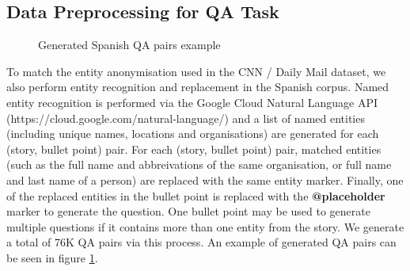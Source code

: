\documentclass[]{article}
\begin{document}
\subsection{Data Preprocessing for QA Task}

\begin{center}
\begin{figure}
\caption{Generated Spanish QA pairs example}
\label{fig:esqa}
\end{figure}
\end{center}

To match the entity anonymisation used in the CNN / Daily Mail dataset, we also perform entity recognition and replacement in the Spanish corpus. Named entity recognition is performed via the Google Cloud Natural Language API (https://cloud.google.com/natural-language/) and a list of named entities (including unique names, locations and organisations) are generated for each (story, bullet point) pair. For each (story, bullet point) pair, matched entities (such as the full name and abbreivations of the same organisation, or full name and last name of a person) are replaced with the same entity marker. Finally, one of the replaced entities in the bullet point is replaced with the \textbf{@placeholder} marker to generate the question. One bullet point may be used to generate multiple questions if it contains more than one entity from the story. We generate a total of 76K QA pairs via this process. An example of generated QA pairs can be seen in figure \ref{fig:esqa}.
\end{document}
